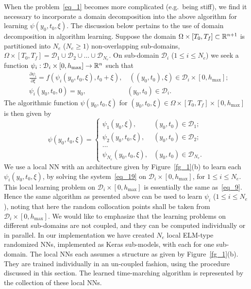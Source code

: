 \begin{remark}\label{rem_23}
  When the problem~\eqref{eq_1} becomes more complicated (e.g.~being stiff),
  we find it necessary to incorporate a domain decomposition into the above
  algorithm for learning $\psi(y_0,t_0,\xi)$. The discussion below pertains to
  the use of domain decomposition in algorithm learning.
  Suppose the domain $\Omega\times[T_0,T_f]\subset\mathbb{R}^{n+1}$ is
  partitioned into $N_e$ ($N_e\geqslant 1$)
  non-overlapping sub-domains,
  $\Omega\times[T_0,T_f]=\mathcal{D}_1\cup\mathcal{D}_2\cup\dots\cup\mathcal{D}_{N_e}$.
  On sub-domain $\mathcal{D}_i$ ($1\leqslant i\leqslant N_e$) we seek a
  function $\psi_i: \mathcal{D}_i\times[0,h_{\max}]\rightarrow\mathbb{R}^n$ such that
  \begin{subequations}\label{eq_19}
    \begin{align}
      &
      \frac{\partial\psi_i}{\partial\xi} = f(\psi_i(y_0,t_0,\xi), t_0+\xi), \quad
      ((y_0,t_0),\xi)\in\mathcal{D}_i\times[0,h_{\max}];
      \\
      &
        \psi_i(y_0,t_0,0) = y_0, \quad\quad\quad\quad\quad\quad (y_0,t_0)\in\mathcal{D}_i.
  \end{align}
  \end{subequations}
  The algorithmic function
  $\psi(y_0,t_0,\xi)$ for $(y_0,t_0,\xi)\in\Omega\times[T_0,T_f]\times[0,h_{\max}]$
  is then given by
  \begin{equation}
    \psi(y_0,t_0,\xi) = \left\{
    \begin{array}{ll}
      \psi_1(y_0,\xi), & (y_0,t_0)\in\mathcal{D}_1; \\
      \psi_2(y_0,t_0,\xi), & (y_0,t_0)\in\mathcal{D}_2; \\
      \dots \\
      \psi_{N_e}(y_0,t_0,\xi), & (y_0,t_0)\in\mathcal{D}_{N_e}.
    \end{array}
    \right.
  \end{equation}
  We use a local NN with an architecture given by Figure~\ref{fg_1}(b)
  to learn each $\psi_i(y_0,t_0,\xi)$, by solving the system~\eqref{eq_19}
  on $\mathcal D_i\times[0,h_{\max}]$, for $1\leqslant i\leqslant N_e$.
  This local learning problem on $\mathcal{D}_i\times[0,h_{\max}]$ is essentially
  the same as~\eqref{eq_9}.
  Hence the same algorithm as
  presented above can be used to
  learn $\psi_i$
  ($1\leqslant i\leqslant N_e$), noting that here the random collocation points
  shall be taken from $\mathcal{D}_i\times[0,h_{\max}]$. 
  We would like to emphasize that the learning problems
  on different sub-domains are not coupled, and they
  can be computed individually or in parallel.
  In our implementation we have created $N_e$ local ELM-type randomized NNs,
  implemented as Keras sub-models,
  with each for one sub-domain. The local NNs  each
  assumes a structure as given by Figure~\ref{fg_1}(b). They are
  trained individually  in an un-coupled fashion,
  using the procedure discussed in this section.
  The learned time-marching algorithm is represented by
  the collection of these local NNs.
  
\end{remark}


